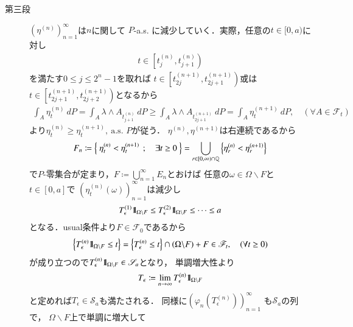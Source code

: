 \begin{prf}
\begin{description}
			\item[第三段]
				$\left( \eta^{(n)} \right)_{n=1}^\infty$は$n$に関して
				$P$-a.s. に減少していく．実際，任意の$t \in [0,a)$に対し
				\begin{align}
					t \in \left[t^{(n)}_j, t^{(n)}_{j+1}\right)
				\end{align}
				を満たす$0 \leq j \leq 2^n-1$を取れば
				$t \in \left[t^{(n+1)}_{2j}, t^{(n+1)}_{2j+1}\right)$或は
				$t \in \left[t^{(n+1)}_{2j+1}, t^{(n+1)}_{2j+2}\right)$となるから
				\begin{align}
					\int_A \eta^{(n)}_t\ dP
					= \int_A \lambda \wedge A_{t^{(n)}_{j+1}}\ dP
					\geq \int_A \lambda \wedge A_{t^{(n+1)}_{2j+1}}\ dP
					= \int_A \eta^{(n+1)}_t\ dP,
					\quad (\forall A \in \mathscr{F}_t)
				\end{align}
				より$\eta^{(n)}_t \geq \eta^{(n+1)}_t,\ \mbox{a.s. $P$}$が従う．
				$\eta^{(n)},\eta^{(n+1)}$は右連続であるから
				\begin{align}
					F_n \coloneqq \left\{\ \eta^{(n)}_t < \eta^{(n+1)}_t\ \, ; \quad \exists t \geq 0\ \right\}
					= \bigcup_{r \in [0,\infty) \cap \mathbb{Q}} \left\{\eta^{(n)}_r < \eta^{(n+1)}_r\right\}
				\end{align}
				で$P$-零集合が定まり，$F \coloneqq \bigcup_{n=1}^\infty E_n$とおけば
				任意の$\omega \in \Omega \backslash F$と$t \in [0,a]$で
				$\left( \eta^{(n)}_t(\omega) \right)_{n=1}^\infty$は減少し
				\begin{align}
					T^{(1)}_\epsilon \mbox{1}\hspace{-0.25em}\mbox{l}_{\Omega \backslash F} 
					\leq T^{(2)}_\epsilon \mbox{1}\hspace{-0.25em}\mbox{l}_{\Omega \backslash F} \leq \cdots \leq a
					\label{eq:chapter_1_theorem_4_14_2}
				\end{align}
				となる．usual条件より$F \in \mathscr{F}_0$であるから
				\begin{align}
					\left\{ T^{(n)}_\epsilon \mbox{1}\hspace{-0.25em}\mbox{l}_{\Omega \backslash F} \leq t \right\}
					= \left\{ T^{(n)}_\epsilon \leq t \right\} \cap (\Omega \backslash F) + F
					\in \mathscr{F}_t,\quad (\forall t \geq 0)
				\end{align}
				が成り立つので$T^{(n)}_\epsilon \mbox{1}\hspace{-0.25em}\mbox{l}_{\Omega \backslash F} \in \mathscr{S}_a$となり，
				単調増大性より
				\begin{align}
					T_\epsilon \coloneqq \lim_{n \to \infty} T^{(n)}_\epsilon \mbox{1}\hspace{-0.25em}\mbox{l}_{\Omega \backslash F}
				\end{align}
				と定めれば$T_\epsilon \in \mathscr{S}_a$も満たされる．
				同様に$\left(\varphi_n\left(T^{(n)}_\epsilon\right)\right)_{n=1}^\infty$
				も$\mathscr{S}_a$の列で，
				$\Omega \backslash F$上で単調に増大して

\end{description}
\end{prf}
